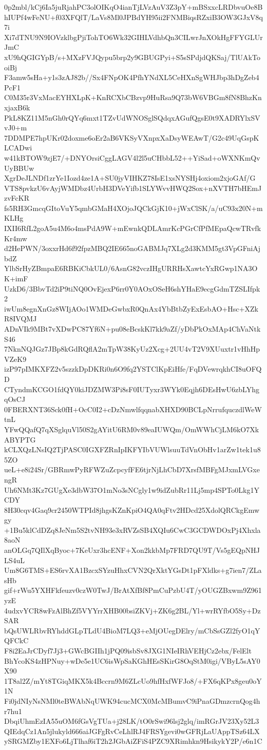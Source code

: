 0p2mbl/kCj6Ia5juRjahPC3olOIKqO4ianTjLVzAuV3Z3pY+mBSxxcLRDbvuOe8B
hIUPf4wFeNU+f03XFQlT/LaVs8Ml0JPBdYH95ii2FNMBiqsRZxiB3OW3GJxV8q7i
Xi7dTNU9N9IOVzklbgPjiTohTO6Wk32GIHLVdhbQn3CILwrJnXOkHgFFYGLUrJmC
xU9hQGIGYpB/s+MXzFVJQypu5brp2y9GBUGPyi+S5sSPdjdQKSaj/TlUAkTooiBj
F3amw5sHa+y1s3zAJ82b//Sx4FNpOK4PfhYNdXL5CeHXnSgWHJbp3hDgZeb4PcF1
C0M35r3VxMacEYHXLpK+KnRCXbCBzvp9HuRsa9Q73bW6VBGm8fN8BhzKnxjaxB6k
PkL8KZ11M5nGh0rQYq6mxt1TZvUdWNOSglSQdqxAGufQgsE0t9XADRYlxSVvJ0+m
7DDMPE7hpUKr02doxme6oEr2aB6VKSyVXnpxXaDsyWEAwT/G2c49UqGspKLCADwi
w41kBTOW9zjE7/+DNYOrsiCggLAGV4l2l5uCHbbL52++YiSad+oWXNKmQvUyBBUw
XgrDeJLNDf1zrYe1Iozd4ze1A+SU0jyVIHKZ78IsE1xsNYSHj4oxiom2xjoGAf/G
VTS8pvkzU6vAyjWMDbz4UrbH3DVeYifb1SLYWvvHWQ2Sox+nXVTH7bHEmJzvFcKR
fs5RH3GmcqGItoVuY5qmbGMaH4XOjoJQCkGjK10+jWxClSK/a/uC93x20N+mKLHg
IXII6RfL2goA5u4M6o4msPdA9W+mEwnkQDLAmrKcPGrCfPfMEpaQcwTRvfkKr4mw
d2HePWN/3oxxrHd6f92fpzMBQ2IE665noGABMJq7XLg2d3KMM5gt3VpGFniAjbdZ
YlbSrHyZBmpaE6RBKiCbkUL0/6AsnG82vczIHgURRHsXawtcYxRGwp1NA3OK+imF
UzkD6/3BbvTd2iP9tiNQ0OvEjexP6rr0Y0AOxOSeH6shYHaE9ecgGdmTZSLIfpk2
iwUm8egnXnGz8WIjAOo1WMDeGwbxR0QnAx4YbBtbZyExEsbAO+Hsc+XZkR8IVQMJ
ADnVIk9MBt7vXDwPC87Yf6N+pu08eBcskKl7kk9aZf/yDbPkOxMAp4ChVaNtkS46
7NknNQJGz7JBp8kGdRQflA2mTpW38KyUz2Xcg+2UU4vT2V9XUuxtr1vHhHpVZeK9
izP97pIMKXFZ2v5szzkDpDKRi0n6O9fq2YSTClKpEiHfe/FqDVewrqkhCI8uOFQD
CTyndmKCGO1fdQY0kiJDZMW3Pi8sF0IUTyxr3WYk0Eqjh6DEsHwU6zbLYhgqOsCJ
0FBERXNT36Sck0fH+OcC0I2+cDzNmwlfqqnabXHXD90BCLpNrrufquczdlWeWtnL
YFwQQafQ7qXSglquVl50S2gAYitU6RM0v89eaIUWQm/OmWWhCjLM6kO7XkABYPTG
kCLXQzLNsIQ2TjPASC0IGXFZRnIpIKFYIbVUWlsuuTdVnObHv1arZw1tek1u85ZO
ueL+e8i24Sr/GBRmwPyRFWZuZcpcyfFE6tjrNjLhCbD7XrsfMBFgMJxmLVGxengR
Uh6NMt3Kz7GUgXe3dbW37O1mNo3sNCgly1w9idZubRr11Lj5mp4SPTo0Lkg1YCDY
8H30cqv4Gaq9cr2450WTPId8jhgsKZnKpiO4QA0qFtv2HDcd25XdolQRCkgEmwgy
+1Bu5klCdDZq8JeNm5S2tvNH93e3xRVZsSB4XQIu6CwC3GCDWDOxPj4Xhxla8aoN
anOLGq7QIlXqByoc+7KeUxr3hcENF+Xon2kkbMp7FRD7QU9T/Vs5gEQpNHJLS4uL
Um8G6TMS+ES6rvXA1BzcxSYzuHhxCVN2QrXktYGsDt1pFXldks+g7ien7/ZLasHb
gif+rWu5YXHFkfeuzv0czW0TwJ/BrAtXfBf8PmCuPzbU4T/yOUGZBxwm9Z961yzE
4udxvYCR8wFzAlBhZf5VYYrrXHB00bsiZKVj+ZK6g2BL/Yl+wrRYfbO5Sy+DzSAR
bQsUWLRbvRYhddGLpTLdU4BioM7LQ3+eMjOUegDElry/mCbSsGZl2fyO1qYQFCkC
F8i2EaJrCDyf7Jj3+GWcBGIIh1jPQ09isbSv8JXG1NIeIRhVEHjCz2ebx/FelElt
BhYcoKS4zHPNuy+wDe5e1UC6isWpSaKGhHEsSKirG8OqStM0igi/VByL5sAY0X90
1T8al2Z/mYt8TGiqMKX5k4Bccrn9M6ZLcUo9hfHxfWFJo8/+FX6qKPx8geu0oY1N
Fi0jdNIyNsNMl0teBWAbNqUWK94cucMCX0McMBumvC9iPnaGDmzcrnQog4hr7hu1
DbqiUhmEzIA55uOM6fGsVgTUa+j28LK/tO0rSwi96lsj2glq/imRGrJV23Xy52L3
QIEdqCz1An5jlukyld666aiJGFgRvCeLhlRJ4FRSYgevi0wGFRjLaUAppTSz64LX
ySRGMZby1EXFo6LjTlhaf6iT2h2JGbAiZFiS4PZC9XRimhkn9HsikykY2P/e6n1C
